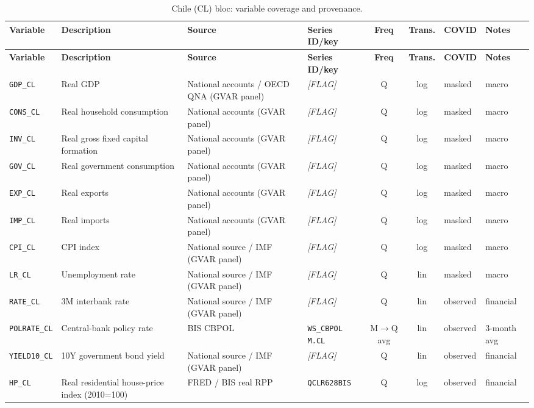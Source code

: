 {\footnotesize
\begin{longtable}{@{}llp{2.5cm}p{2.4cm}cclp{2.6cm}@{}}
\caption{Chile (CL) bloc: variable coverage and provenance.}\label{tab:data:CL}\\
\toprule
\textbf{Variable} & \textbf{Description} & \textbf{Source} & \textbf{Series ID/key} & \textbf{Freq} & \textbf{Trans.} & \textbf{COVID} & \textbf{Notes} \\
\midrule
\endfirsthead
\toprule
\textbf{Variable} & \textbf{Description} & \textbf{Source} & \textbf{Series ID/key} & \textbf{Freq} & \textbf{Trans.} & \textbf{COVID} & \textbf{Notes} \\
\midrule
\endhead
\bottomrule
\endfoot
\texttt{GDP\_CL}  & Real GDP & National accounts / OECD QNA (GVAR panel) & \textit{[FLAG]} & Q & log & masked & macro \\
\texttt{CONS\_CL} & Real household consumption & National accounts (GVAR panel) & \textit{[FLAG]} & Q & log & masked & macro \\
\texttt{INV\_CL}  & Real gross fixed capital formation & National accounts (GVAR panel) & \textit{[FLAG]} & Q & log & masked & macro \\
\texttt{GOV\_CL}  & Real government consumption & National accounts (GVAR panel) & \textit{[FLAG]} & Q & log & masked & macro \\
\texttt{EXP\_CL}  & Real exports & National accounts (GVAR panel) & \textit{[FLAG]} & Q & log & masked & macro \\
\texttt{IMP\_CL}  & Real imports & National accounts (GVAR panel) & \textit{[FLAG]} & Q & log & masked & macro \\
\texttt{CPI\_CL}  & CPI index & National source / IMF (GVAR panel) & \textit{[FLAG]} & Q & log & masked & macro \\
\texttt{LR\_CL}   & Unemployment rate & National source / IMF (GVAR panel) & \textit{[FLAG]} & Q & lin & masked & macro \\
\texttt{RATE\_CL} & 3M interbank rate & National source / IMF (GVAR panel) & \textit{[FLAG]} & Q & lin & observed & financial \\
\texttt{POLRATE\_CL} & Central-bank policy rate & BIS CBPOL & \texttt{WS\_CBPOL M.CL} & M$\to$Q avg & lin & observed & 3-month avg \\
\texttt{YIELD10\_CL} & 10Y government bond yield & National source / IMF (GVAR panel) & \textit{[FLAG]} & Q & lin & observed & financial \\
\texttt{HP\_CL}   & Real residential house-price index (2010=100) & FRED / BIS real RPP & \texttt{QCLR628BIS} & Q & log & observed & financial \\

\end{longtable}}
